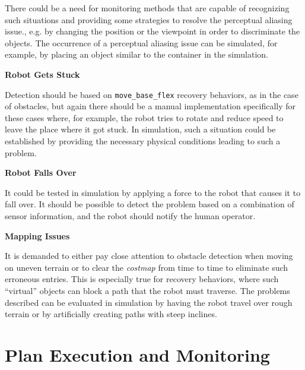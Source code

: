 \documentclass[english, master, utf8]{base/thesis_KBS}
\newcommand{\code}[1]{\colorbox{light-gray}{\texttt{#1}}}
\begin{document}
\noindent
There could be a need for monitoring methods that are capable of recognizing such situations and providing some strategies to resolve the 
perceptual aliasing issue., e.g. by changing the position or the viewpoint in order to discriminate the objects.\newline
The occurrence of a perceptual aliasing issue can be simulated, for example, by placing an object similar to the container in the simulation.\newline

\noindent
\textbf{Robot Gets Stuck}\newline

\noindent
Detection should be based on \code{move\_base\_flex} recovery behaviors, as in the case of obstacles, but again there should be a manual implementation 
specifically for these cases where, for example, the robot tries to rotate and reduce speed to leave the place where it got stuck.\newline
In simulation, such a situation could be established by providing the necessary physical conditions leading to such a problem.\newline

\noindent
\textbf{Robot Falls Over}\newline

\noindent
It could be tested in simulation by applying a force to the robot that causes it to fall over.\newline
It should be possible to detect the problem based on a combination of sensor information, and the robot should notify the human operator.\newline

\noindent
\textbf{Mapping Issues}\newline

\noindent
It is demanded to either pay close attention to obstacle detection when moving on uneven terrain or to clear the \textit{costmap} from time to time
to eliminate such erroneous entries. This is especially true for recovery behaviors,  where such ``virtual'' objects can block a path that the robot must traverse.\newline
The problems described can be evaluated in simulation by having the robot travel over rough terrain or by artificially creating paths with steep inclines.

\chapter{Plan Execution and Monitoring}
\end{document}
